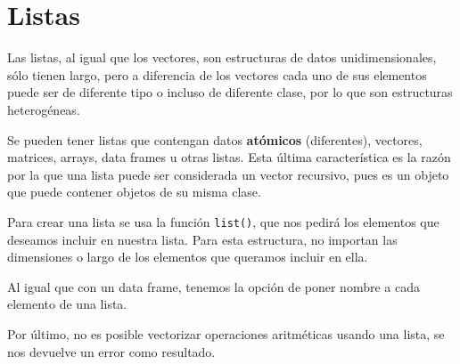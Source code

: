\documentclass[
]{book}
\newenvironment{Shaded}{\begin{snugshade}}{\end{snugshade}}
\newcommand{\DecValTok}[1]{\textcolor[rgb]{0.00,0.00,0.81}{#1}}
\newcommand{\FloatTok}[1]{\textcolor[rgb]{0.00,0.00,0.81}{#1}}
\newcommand{\FunctionTok}[1]{\textcolor[rgb]{0.00,0.00,0.00}{#1}}
\newcommand{\NormalTok}[1]{#1}
\newcommand{\OtherTok}[1]{\textcolor[rgb]{0.56,0.35,0.01}{#1}}
\newcommand{\SpecialCharTok}[1]{\textcolor[rgb]{0.00,0.00,0.00}{#1}}
\newcommand{\StringTok}[1]{\textcolor[rgb]{0.31,0.60,0.02}{#1}}
\begin{document}
\begin{Shaded}
\end{Shaded}

\hypertarget{listas-1}{%
\section{Listas}\label{listas-1}}

Las listas, al igual que los vectores, son estructuras de datos unidimensionales, sólo tienen largo, pero a diferencia de los vectores cada uno de sus elementos puede ser de diferente tipo o incluso de diferente clase, por lo que son estructuras heterogéneas.

Se pueden tener listas que contengan datos \textbf{atómicos} (diferentes), vectores, matrices, arrays, data frames u otras listas. Esta última característica es la razón por la que una lista puede ser considerada un vector recursivo, pues es un objeto que puede contener objetos de su misma clase.

Para crear una lista se usa la función \texttt{list()}, que nos pedirá los elementos que deseamos incluir en nuestra lista. Para esta estructura, no importan las dimensiones o largo de los elementos que queramos incluir en ella.

Al igual que con un data frame, tenemos la opción de poner nombre a cada elemento de una lista.

Por último, no es posible vectorizar operaciones aritméticas usando una lista, se nos devuelve un error como resultado.
\end{document}
